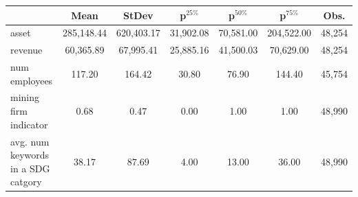 
\begin{tabular}{lcccccc}
\toprule
  & Mean & StDev & p$^{25\%}$ & p$^{50\%}$ & p$^{75\%}$ & Obs.\\
\midrule
asset & 285,148.44 & 620,403.17 & 31,902.08 & 70,581.00 & 204,522.00 & 48,254\\
revenue & 60,365.89 & 67,995.41 & 25,885.16 & 41,500.03 & 70,629.00 & 48,254\\
num employees & 117.20 & 164.42 & 30.80 & 76.90 & 144.40 & 45,754\\
mining firm indicator & 0.68 & 0.47 & 0.00 & 1.00 & 1.00 & 48,990\\
avg. num keywords in a SDG catgory & 38.17 & 87.69 & 4.00 & 13.00 & 36.00 & 48,990\\
\bottomrule
\end{tabular}
